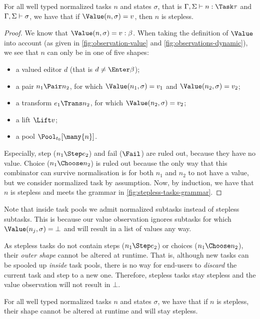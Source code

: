 \begin{proposition}
  \label{prp:valued-means-stepless}
  For all well typed normalized tasks $n$ and states $\sigma$,
  that is $\Gamma,\Sigma \infers n:\Task\tau$ and $\Gamma,\Sigma \vdash \sigma$,
  we have that
    if $\Value(n,\sigma) = v$,
    then $n$ is stepless.
\end{proposition}
\begin{proof}
  We know that $\Value(n,\sigma) = v : \beta$.
  When taking the definition of $\Value$ into account (as given in \cref{fig:observation-value} and \cref{fig:observations-dynamic}),
  we see that $n$ can only be in one of five shapes:
  \begin{itemize}
    \item a valued editor $d$ (that is $d \neq \Enter\beta$);
    \item a pair $n_1 \Pair n_2$, for which $\Value(n_1,\sigma) = v_1$ and $\Value(n_2,\sigma) = v_2$;
    \item a transform $e_1 \Trans n_2$, for which $\Value(n_2,\sigma) = v_2$;
    \item a lift $\Lift v$;
    \item a pool $\Pool_{t_0} [\many{n}]$.
  \end{itemize}
  Especially, step ($n_1 \Step e_2$) and fail ($\Fail$) are ruled out, because they have no value.
  Choice ($n_1 \Choose n_2$) is ruled out
  because the only way that this combinator can survive normalisation is for both $n_1$ and $n_2$ to not have a value,
  but we consider normalized task by assumption.
  Now, by induction, we have that $n$ is stepless and meets the grammar in \cref{fig:stepless-tasks-grammar}.
\end{proof}

Note that inside task pools we admit normalized subtasks instead of stepless subtasks.
This is because our value observation ignores subtasks for which $\Value(n_j,\sigma) = \bot$
and will result in a list of values any way.

As stepless tasks do not contain steps ($n_1 \Step e_2$) or choices ($n_1 \Choose n_2$),
their \emph{outer shape} cannot be altered at runtime.
That is, although new tasks can be spooled up \emph{inside} task pools,
there is no way for end-users to \emph{discard} the current task
and step to a new one.
Therefore, stepless tasks stay stepless and the value observation will not result in $\bot$.

\begin{corollary}
  \label{cor:stepless-stays-stepless}
  For all well typed normalized tasks $n$ and states $\sigma$,
  we have that
    if $n$ is stepless,
    their shape cannot be altered at runtime
    and will stay stepless.
\end{corollary}

